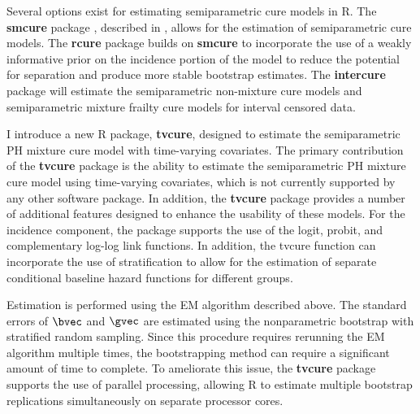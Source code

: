 \documentclass[letterpaper, 12pt]{article}
\theoremstyle{plain}
\begin{document}
		Several options exist for estimating semiparametric cure models in R. The \textbf{smcure} package \citep{cai2012a}, described in \citep{cai2012}, allows for the estimation of semiparametric cure models. The \textbf{rcure} package \citep{han2017} builds on \textbf{smcure} to incorporate the use of a weakly informative prior on the incidence portion of the model to reduce the potential for separation and produce more stable bootstrap estimates. The \textbf{intercure} package \citep{brettas2016} will estimate the semiparametric non-mixture cure models and semiparametric mixture frailty cure models for interval censored data. 

I introduce a new R package, \textbf{tvcure}, designed to estimate the semiparametric PH mixture cure model with time-varying covariates. The primary contribution of the \textbf{tvcure} package is the ability to estimate the semiparametric PH mixture cure model using time-varying covariates, which is not currently supported by any other software package. In addition, the \textbf{tvcure} package provides a number of additional features designed to enhance the usability of these models.
	For the incidence component, the package supports the use of the logit, probit, and complementary log-log link functions. %
	In addition, the tvcure function can incorporate the use of stratification to allow for the estimation of separate conditional baseline hazard functions for different groups. 

Estimation is performed using the EM algorithm described above. The standard errors of $\bvec$ and $\gvec$ are estimated using the nonparametric bootstrap with stratified random sampling. 
Since this procedure requires rerunning the EM algorithm multiple times, the bootstrapping method can require a significant amount of time to complete. To ameliorate this issue, the \textbf{tvcure} package supports the use of parallel processing, allowing R to estimate multiple bootstrap replications simultaneously on separate processor cores. 
\end{document}
